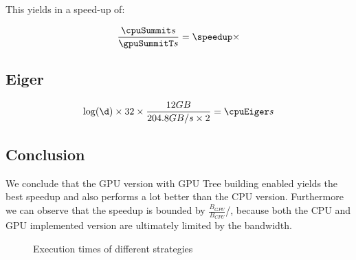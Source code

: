 \documentclass[]{article}
\begin{document}
This yields in a speed-up of:
\pgfmathsetmacro\speedup{\cpuSummit / \gpuSummitT}
\begin{center}
	\begin{equation}
		\frac{\cpuSummit s}{\gpuSummitT s} = \speedup \times
	\end{equation}
\end{center}


\vspace{5mm}


\subsection{Eiger}

\pgfmathsetmacro{}

\begin{center}
	\begin{equation}
		\log(\d) \times \p \times \frac{ \s GB }{204.8 GB/s \times 2} = \cpuEiger s
	\end{equation}
\end{center}

\subsection{Conclusion}

We conclude that the GPU version with GPU Tree building enabled yields the best speedup and also performs a lot better than the CPU version. Furthermore we can observe that the speedup is bounded by $\frac{B_{GPU}}{B_{CPU}}$/, because both the CPU and GPU implemented version are ultimately limited by the bandwidth.

\begin{figure}[H]
	\begin{center}
	\end{center}

\caption{Execution times of different strategies}
\label{fig:exectimes}
\end{figure}
\end{document}
